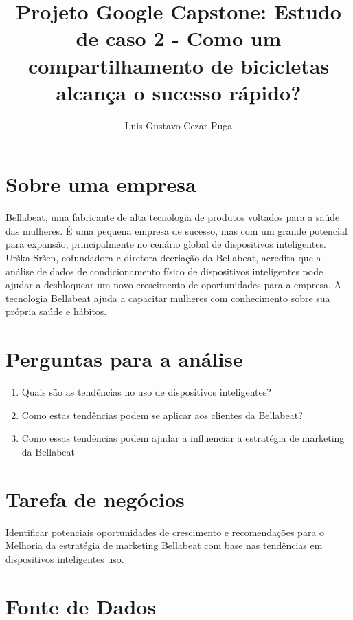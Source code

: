 \documentclass[
]{article}
\title{Projeto Google Capstone: Estudo de caso 2 - Como um
compartilhamento de bicicletas alcança o sucesso rápido?}
\author{Luis Gustavo Cezar Puga}
\date{}
\providecommand{\tightlist}{%
  \setlength{\itemsep}{0pt}\setlength{\parskip}{0pt}}
\begin{document}
\maketitle

\hypertarget{sobre-uma-empresa}{%
\section{Sobre uma empresa}\label{sobre-uma-empresa}}

Bellabeat, uma fabricante de alta tecnologia de produtos voltados para a
saúde das mulheres. É uma pequena empresa de sucesso, mas com um grande
potencial para expansão, principalmente no cenário global de
dispositivos inteligentes. Urška Sršen, cofundadora e diretora decriação
da Bellabeat, acredita que a análise de dados de condicionamento físico
de dispositivos inteligentes pode ajudar a desbloquear um novo
crescimento de oportunidades para a empresa. A tecnologia Bellabeat
ajuda a capacitar mulheres com conhecimento sobre sua própria saúde e
hábitos.

\hypertarget{perguntas-para-a-anuxe1lise}{%
\section{Perguntas para a análise}\label{perguntas-para-a-anuxe1lise}}

\begin{enumerate}
\def\labelenumi{\arabic{enumi}.}
\tightlist
\item
  Quais são as tendências no uso de dispositivos inteligentes?
\item
  Como estas tendências podem se aplicar aos clientes da Bellabeat?
\item
  Como essas tendências podem ajudar a influenciar a estratégia de
  marketing da Bellabeat
\end{enumerate}

\hypertarget{tarefa-de-neguxf3cios}{%
\section{Tarefa de negócios}\label{tarefa-de-neguxf3cios}}

Identificar potenciais oportunidades de crescimento e recomendações para
o Melhoria da estratégia de marketing Bellabeat com base nas tendências
em dispositivos inteligentes uso.

\hypertarget{fonte-de-dados}{%
\section{Fonte de Dados}\label{fonte-de-dados}}
\end{document}
